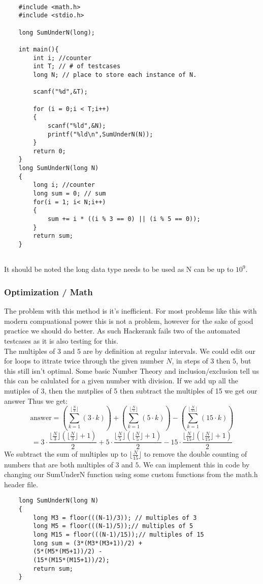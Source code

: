 \documentclass[12pt]{article}
\begin{document}
\begin{verbatim}
	
	#include <math.h>
	#include <stdio.h>
	
	long SumUnderN(long);
	
	int main(){
		int i; //counter
		int T; // # of testcases
		long N; // place to store each instance of N.
		
		scanf("%d",&T);
		
		for (i = 0;i < T;i++)
		{
			scanf("%ld",&N); 
			printf("%ld\n",SumUnderN(N));
		}
		return 0;
	}
	long SumUnderN(long N)
	{
		long i; //counter
		long sum = 0; // sum
		for(i = 1; i< N;i++)
		{
			sum += i * ((i % 3 == 0) || (i % 5 == 0));
		}
		return sum;
	}
	
\end{verbatim}
It should be noted the long data type needs to be used as N can be up to $10^{9}$.
\subsubsection{Optimization / Math}
The problem with this method is it's inefficient. For most problems like this with modern compuational power this is not a problem, however for  the sake of good practice we should do better. As such Hackerank fails two of the automated testcases as it is also testing for this. 
\\
 The multiples of $3$ and $5$ are by definition at regular intervals.  We could edit our for loops to ittrate twice through the given number $N$, in steps of $3$ then $5$, but this still isn't optimal. Some basic Number Theory and inclusion/exclusion tell us this can be calulated for a given number with division. If we add up all the mutiples of 3, then the mutplies of 5 then subtract the multiples of 15 we get our answer Thus we get:
 \[
   \text{answer}  =
    \left(\sum_{k = 1}^{\lfloor \frac{N}{3} \rfloor}  \left( 3\cdot k\right) \right)  +
        \left(\sum_{k = 1}^{\lfloor \frac{N}{5} \rfloor}  \left( 5\cdot k\right) \right)  -
            \left(\sum_{k = 1}^{\lfloor \frac{N}{15} \rfloor}  \left( 15\cdot k\right) \right)  
 	\]
 \[
 	=  3\cdot  \frac{\lfloor \frac{N}{3} \rfloor \left( \lfloor \frac{N}{3} \rfloor + 1\right)  }{2} +
 	5\cdot \frac{\lfloor \frac{N}{5} \rfloor \left( \lfloor \frac{N}{5} \rfloor + 1\right)  }{2} -
 	15\cdot \frac{\lfloor \frac{N}{15} \rfloor \left( \lfloor \frac{N}{15} \rfloor + 1\right)  }{2}
 \]
We subtract the sum of multiples up to  $\lfloor \frac{N}{15} \rfloor$ to remove the double counting of numbers that are both multiples of $3$ and $5$. We can implement this in code by changing our SumUnderN function using some custom functions from the math.h header file.
\\
\begin{verbatim}
	long SumUnderN(long N)
	{
		long M3 = floor(((N-1)/3)); // multiples of 3
		long M5 = floor(((N-1)/5));// multiples of 5
		long M15 = floor(((N-1)/15));// multiples of 15
		long sum = (3*(M3*(M3+1))/2) + 
		(5*(M5*(M5+1))/2) - 
		(15*(M15*(M15+1))/2);
		return sum;
	}
\end{verbatim}
\end{document}
